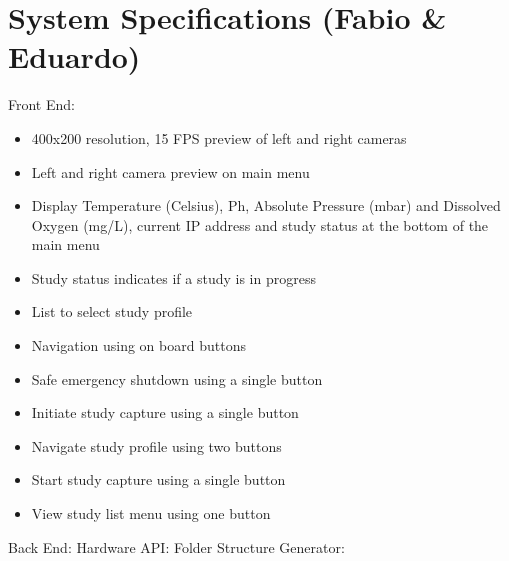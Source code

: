 \section{System Specifications (Fabio \& Eduardo)}
Front End:
\begin{itemize}
	\item 400x200 resolution, 15 FPS preview of left and right cameras
	\item Left and right camera preview on main menu
	\item Display Temperature (Celsius), Ph, Absolute Pressure (mbar) and Dissolved Oxygen (mg/L), current IP address and study status at the bottom of the main menu
	\item Study status indicates if a study is in progress
	\item List to select study profile
	\item Navigation using on board buttons
	\item Safe emergency shutdown using a single button
	\item Initiate study capture using a single button
	\item Navigate study profile using two buttons
	\item Start study capture using a single button
	\item View study list menu using one button
\end{itemize}
Back End:
Hardware API:
Folder Structure Generator: